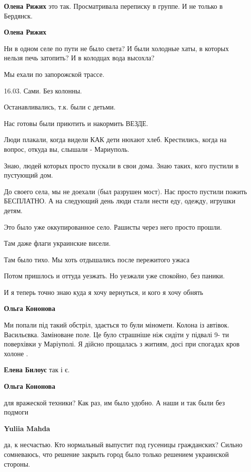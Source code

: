\begin{itemize}
\textbf{Олена Рижих} это так. Просматривала переписку в группе. И не только в Бердянск.

\textbf{Олена Рижих} 

Ни в одном селе по пути не было света? И были холодные хаты, в которых нельзя
печь затопить? И в колодцах вода высохла?

Мы ехали по запорожской трассе.

16.03. Сами. Без колонны.

Останавливались, т.к. были с детьми.

Нас готовы были приютить и накормить ВЕЗДЕ.

Люди плакали, когда видели КАК дети нюхают хлеб. Крестились, когда на вопрос,
откуда вы, слышали - Мариуполь.

Знаю, людей которых просто пускали в свои дома. Знаю таких, кого пустили в
пустующий дом.

До своего села, мы не доехали (был разрушен мост). Нас просто пустили пожить
БЕСПЛАТНО. А на следующий день люди стали нести еду, одежду, игрушки детям.

Это было уже оккупированное село. Рашисты через него просто прошли.

Там даже флаги украинские висели.

Там было тихо. Мы хоть отдышались после пережитого ужаса

Потом пришлось и оттуда уезжать. Но уезжали уже спокойно, без паники.

И я теперь точно знаю куда я хочу вернуться, и кого я хочу обнять

\textbf{Ольга Кононова} 

Ми попали під такий обстріл, здається то були міномети. Колона із автівок.
Васильєвка. Заміноване поле. Це було страшніше ніж сидіти у підвалі 9- ти
поверхівки у Маріуполі. Я дійсно прощалась з житиям, досі при спогадах кров
холоне .

\textbf{Елена Билоус} так і є.

\textbf{Ольга Кононова}

для вражеской техники? Как раз, им было удобно. А наши и так были без подмоги

\textbf{Yuliia Mahda} 

да, к несчастью. Кто нормальный выпустит под гусеницы гражданских? Сильно
сомневаюсь, что решение закрыть город было только решением украинской стороны.


\end{itemize}
